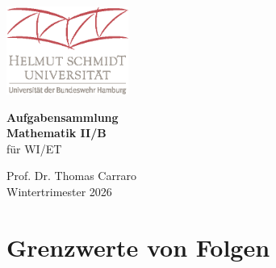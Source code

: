 





\thispagestyle{empty} 
\begin{center}
    \vspace*{2cm}
    \includegraphics[width=0.3\textwidth]{HSU_RGB.eps} %
\end{center}

\begin{center}
    \vspace{1cm}
    {\LARGE \textbf{Aufgabensammlung}}\\
    \vspace{0.5cm}
    {\LARGE \textbf{Mathematik II/B}} \\
    \vspace{0.5cm}
    {\large f\"ur WI/ET} \\
\end{center}


\vfill
\begin{center}
    {\large Prof. Dr. Thomas Carraro} \\
    {\large Wintertrimester 2026}
\end{center}

\newpage
\thispagestyle{empty}
\mbox{}
\newpage
\tableofcontents
\newpage
\thispagestyle{empty}
\mbox{}
\newpage



% 
\renewcommand{\d }{\mathrm{d}}
\setcounter{page}{1}

\section*{Grenzwerte von Folgen}
%
\newpage
